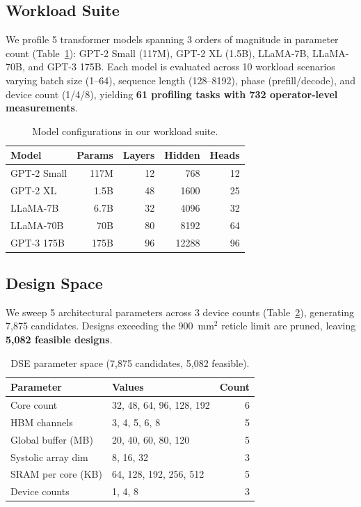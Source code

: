 \documentclass[sigconf,10pt]{acmart}
\begin{document}
\subsection{Workload Suite}

We profile 5 transformer models spanning 3 orders of magnitude in
parameter count (Table~\ref{tab:models}): GPT-2 Small (117M), GPT-2 XL
(1.5B), LLaMA-7B, LLaMA-70B, and GPT-3 175B. Each model is evaluated
across 10 workload scenarios varying batch size (1--64), sequence length
(128--8192), phase (prefill/decode), and device count (1/4/8), yielding
\textbf{61 profiling tasks with 732 operator-level measurements}.

\begin{table}[t]
\centering
\caption{Model configurations in our workload suite.}
\label{tab:models}
\begin{tabular}{lrrrr}
\toprule
\textbf{Model} & \textbf{Params} & \textbf{Layers} & \textbf{Hidden} & \textbf{Heads} \\
\midrule
GPT-2 Small & 117M & 12 & 768 & 12 \\
GPT-2 XL & 1.5B & 48 & 1600 & 25 \\
LLaMA-7B & 6.7B & 32 & 4096 & 32 \\
LLaMA-70B & 70B & 80 & 8192 & 64 \\
GPT-3 175B & 175B & 96 & 12288 & 96 \\
\bottomrule
\end{tabular}
\end{table}

\subsection{Design Space}

We sweep 5 architectural parameters across 3 device counts
(Table~\ref{tab:dse_params}), generating 7,875 candidates. Designs
exceeding the 900~mm$^2$ reticle limit are pruned, leaving \textbf{5,082
feasible designs}.

\begin{table}[t]
\centering
\caption{DSE parameter space (7,875 candidates, 5,082 feasible).}
\label{tab:dse_params}
\begin{tabular}{llr}
\toprule
\textbf{Parameter} & \textbf{Values} & \textbf{Count} \\
\midrule
Core count & 32, 48, 64, 96, 128, 192 & 6 \\
HBM channels & 3, 4, 5, 6, 8 & 5 \\
Global buffer (MB) & 20, 40, 60, 80, 120 & 5 \\
Systolic array dim & 8, 16, 32 & 3 \\
SRAM per core (KB) & 64, 128, 192, 256, 512 & 5 \\
Device counts & 1, 4, 8 & 3 \\
\bottomrule
\end{tabular}
\end{table}
\end{document}
